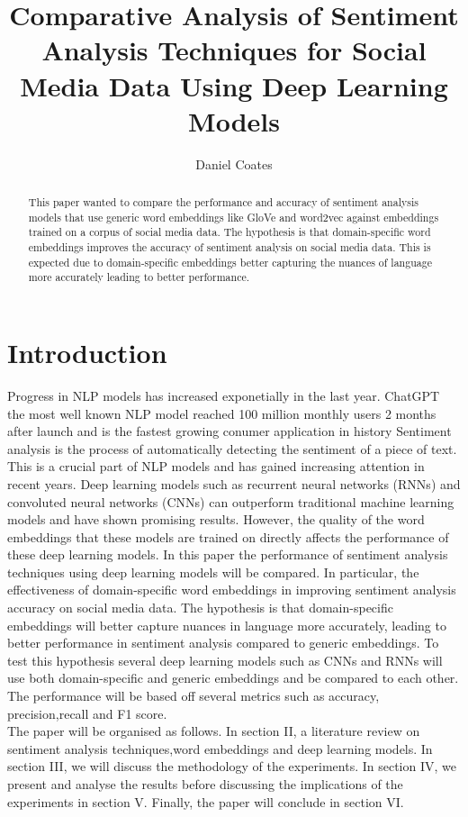 \documentclass[10pt,journal]{IEEEtran}
\begin{document}
\title{Comparative Analysis of Sentiment Analysis Techniques for Social Media Data Using Deep Learning Models}
\author{Daniel Coates}
\maketitle
\begin{abstract}
This paper wanted to compare the performance and accuracy of sentiment analysis models that use generic word embeddings like GloVe and word2vec against embeddings trained on a corpus of social media data. The hypothesis is  that domain-specific word embeddings improves the accuracy of sentiment analysis on social media data. This is expected due to domain-specific embeddings better capturing the nuances of language more accurately leading to better performance.
\end{abstract}
\section{Introduction}
Progress in NLP models has increased exponetially in the last year. ChatGPT the most well known NLP model reached 100 million monthly users 2 months after launch and is the fastest growing conumer application in history 
\cite{hu2023}
Sentiment analysis is the process of automatically detecting the sentiment of a piece of text.
\cite{gupta_2018} 
This is a crucial part of NLP models and has gained increasing attention in recent years. Deep learning models such as recurrent neural networks (RNNs) and convoluted neural networks (CNNs) can outperform traditional machine learning models and have shown promising results. However, the quality of the word embeddings that these models are trained on directly affects the performance of these deep learning models.
In this paper the performance of sentiment analysis techniques using deep learning models will be compared. In particular, the effectiveness of domain-specific word embeddings in improving sentiment analysis accuracy on social media data. The hypothesis is that domain-specific embeddings will better capture nuances in language more accurately, leading to better performance in sentiment analysis compared to generic embeddings.
To test this hypothesis several deep learning models such as CNNs and RNNs will use both domain-specific and generic embeddings and be compared to each other. The performance will be based off several metrics such as accuracy, precision,recall and F1 score.
\\The paper will be organised as follows. In section II, a literature review on sentiment analysis techniques,word embeddings and deep learning models. In section III, we will discuss the methodology of the experiments. In section IV, we present and analyse the results before discussing the implications of the experiments in section V. Finally, the paper will conclude in section VI.
\end{document}
